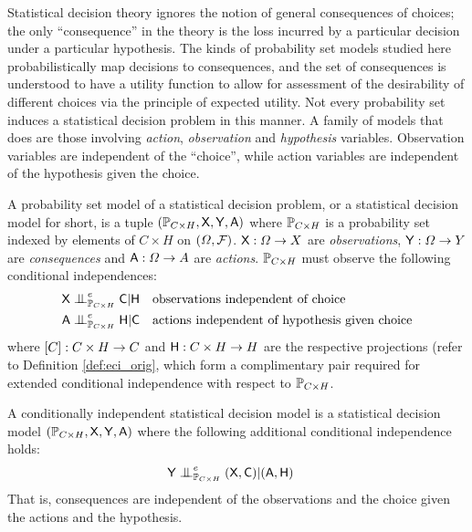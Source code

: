 Statistical decision theory ignores the notion of general consequences of choices; the only ``consequence'' in the theory is the loss incurred by a particular decision under a particular hypothesis. The kinds of probability set models studied here probabilistically map decisions to consequences, and the set of consequences is understood to have a utility function to allow for assessment of the desirability of different choices via the principle of expected utility. Not every probability set induces a statistical decision problem in this manner. A family of models that does are those involving \emph{action}, \emph{observation} and \emph{hypothesis} variables. Observation variables are independent of the ``choice'', while action variables are independent of the hypothesis given the choice.
\begin{definition}\label{def:see_do_model}
A probability set model of a statistical decision problem, or a statistical decision model for short, is a tuple $(\mathbb{P}_{C\times H}, \mathsf{X},\mathsf{Y},\mathsf{A})$ where $\mathbb{P}_{C\times H}$ is a probability set indexed by elements of $C\times H$ on $(\Omega,\mathcal{F})$. $\mathsf{X}:\Omega\to X$ are \emph{observations}, $\mathsf{Y}:\Omega\to Y$ are \emph{consequences} and $\mathsf{A}:\Omega\to A$ are \emph{actions}. $\mathbb{P}_{C\times H}$ must observe the following conditional independences:
\begin{align}
    \RV{X}&\CI^e_{\prob{P}_{C\times H}} \RV{C}|\RV{H}\quad\text{observations independent of choice}\\
    \RV{A}&\CI^e_{\prob{P}_{C\times H}} \RV{H}|\RV{C}\quad\text{actions independent of hypothesis given choice}
\end{align}
where $\mathsf{[}C]:C\times H\to C$ and $\mathsf{H}:C\times H\to H$ are the respective projections (refer to Definition \ref{def:eci_orig}, which form a complimentary pair required for extended conditional independence with respect to $\mathbb{P}_{C\times H}$.
\end{definition}
\begin{definition}\label{def:ci_see_do_model}
A conditionally independent statistical decision model is a statistical decision model $(\mathbb{P}_{C\times H}, \mathsf{X},\mathsf{Y},\mathsf{A})$ where the following additional conditional independence holds:
\begin{align}
    \RV{Y}&\CI^e_{\prob{P}_{C\times H}} (\RV{X,C})|(\RV{A},\RV{H})
\end{align}
That is, consequences are independent of the observations and the choice given the actions and the hypothesis.
\end{definition}

